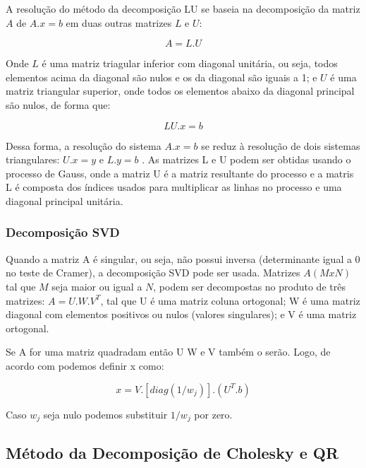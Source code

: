 \documentclass[a4paper,10pt]{report}
\begin{document}
A resolução do método da decomposição LU se baseia na decomposição da matriz $A$ de $A.x = b$ em duas outras matrizes $L$ e $U$:

\begin{equation*}
A = L.U
\end{equation*}

Onde $L$ é uma matriz triagular inferior com diagonal unitária, ou seja, todos elementos acima da diagonal são nulos e os da diagonal são iguais a 1; e $U$ é uma matriz triangular superior, onde todos os elementos abaixo da diagonal principal são nulos, de forma que: 

\begin{equation*}
LU.x = b
\end{equation*}

Dessa forma, a resolução do sistema $A.x = b$ se reduz à resolução de dois sistemas triangulares: $U.x = y$ e $L.y = b$ . As matrizes L e U podem ser obtidas usando o processo de Gauss, onde a matriz U é a matriz resultante do processo e a matris L é composta dos índices usados para multiplicar as linhas no processo e uma diagonal principal unitária.

\subsubsection{Decomposição SVD}

Quando a matriz A é singular, ou seja, não possui inversa (determinante igual a
0 no teste de Cramer), a decomposição SVD pode ser usada. Matrizes $A (M x N)$
tal que $M$ seja maior ou igual a $N$, podem ser decompostas no produto de três
matrizes: $A = U . W . V^{T}$, tal que U é uma matriz coluna ortogonal; W é uma
matriz diagonal com elementos positivos ou nulos (valores singulares); e V é
uma matriz ortogonal.

Se A for uma matriz quadradam então U W e V também o serão. Logo, de acordo com
\cite{press:recipes92} podemos definir x como:

\begin{equation}
x = V . [diag(1/w_j)].(U^T . b)
\end{equation}

Caso $w_j$ seja nulo podemos substituir $1/w_j$ por zero. 

\subsection{Método da Decomposição de Cholesky e QR}
\end{document}
